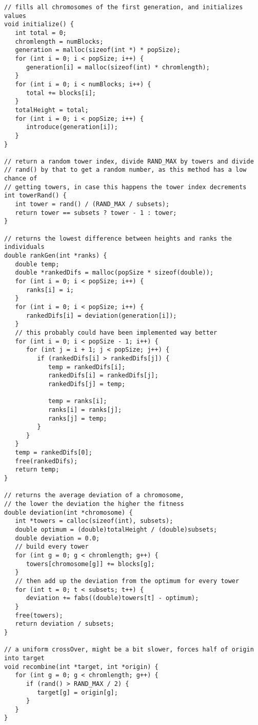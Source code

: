 \documentclass[a4paper,10pt]{article}
\begin{document}
\begin{lstlisting}[style = code, title = parprob.c]
// fills all chromosomes of the first generation, and initializes values
void initialize() {
   int total = 0;
   chromlength = numBlocks;
   generation = malloc(sizeof(int *) * popSize);
   for (int i = 0; i < popSize; i++) {
      generation[i] = malloc(sizeof(int) * chromlength);
   }
   for (int i = 0; i < numBlocks; i++) {
      total += blocks[i];
   }
   totalHeight = total;
   for (int i = 0; i < popSize; i++) {
      introduce(generation[i]);
   }
}

// return a random tower index, divide RAND_MAX by towers and divide
// rand() by that to get a random number, as this method has a low chance of
// getting towers, in case this happens the tower index decrements
int towerRand() {
   int tower = rand() / (RAND_MAX / subsets);
   return tower == subsets ? tower - 1 : tower;
}

// returns the lowest difference between heights and ranks the individuals
double rankGen(int *ranks) {
   double temp;
   double *rankedDifs = malloc(popSize * sizeof(double));
   for (int i = 0; i < popSize; i++) {
      ranks[i] = i;
   }
   for (int i = 0; i < popSize; i++) {
      rankedDifs[i] = deviation(generation[i]);
   }
   // this probably could have been implemented way better
   for (int i = 0; i < popSize - 1; i++) {
      for (int j = i + 1; j < popSize; j++) {
         if (rankedDifs[i] > rankedDifs[j]) {
            temp = rankedDifs[i];
            rankedDifs[i] = rankedDifs[j];
            rankedDifs[j] = temp;

            temp = ranks[i];
            ranks[i] = ranks[j];
            ranks[j] = temp;
         }
      }
   }
   temp = rankedDifs[0];
   free(rankedDifs);
   return temp;
}

// returns the average deviation of a chromosome,
// the lower the deviation the higher the fitness
double deviation(int *chromosome) {
   int *towers = calloc(sizeof(int), subsets);
   double optimum = (double)totalHeight / (double)subsets;
   double deviation = 0.0;
   // build every tower
   for (int g = 0; g < chromlength; g++) {
      towers[chromosome[g]] += blocks[g];
   }
   // then add up the deviation from the optimum for every tower
   for (int t = 0; t < subsets; t++) {
      deviation += fabs((double)towers[t] - optimum);
   }
   free(towers);
   return deviation / subsets;
}

// a uniform crossOver, might be a bit slower, forces half of origin into target
void recombine(int *target, int *origin) {
   for (int g = 0; g < chromlength; g++) {
      if (rand() > RAND_MAX / 2) {
         target[g] = origin[g];
      }
   }
}


\end{lstlisting}
\end{document}
